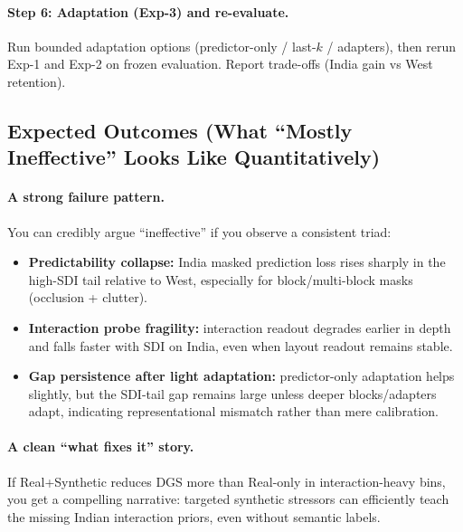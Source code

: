 \paragraph{Step 6: Adaptation (Exp-3) and re-evaluate.}
Run bounded adaptation options (predictor-only / last-$k$ / adapters), then rerun Exp-1 and Exp-2 on frozen evaluation. Report trade-offs (India gain vs West retention).

\subsection{Expected Outcomes (What “Mostly Ineffective” Looks Like Quantitatively)}
\label{sec:expected_outcomes}

\paragraph{A strong failure pattern.}
You can credibly argue “ineffective” if you observe a consistent triad:
\begin{itemize}[leftmargin=*,itemsep=2pt]
  \item \textbf{Predictability collapse:} India masked prediction loss rises sharply in the high-SDI tail relative to West, especially for block/multi-block masks (occlusion + clutter).
  \item \textbf{Interaction probe fragility:} interaction readout degrades earlier in depth and falls faster with SDI on India, even when layout readout remains stable.
  \item \textbf{Gap persistence after light adaptation:} predictor-only adaptation helps slightly, but the SDI-tail gap remains large unless deeper blocks/adapters adapt, indicating representational mismatch rather than mere calibration.
\end{itemize}

\paragraph{A clean “what fixes it” story.}
If Real+Synthetic reduces DGS more than Real-only in interaction-heavy bins, you get a compelling narrative: targeted synthetic stressors can efficiently teach the missing Indian interaction priors, even without semantic labels.

